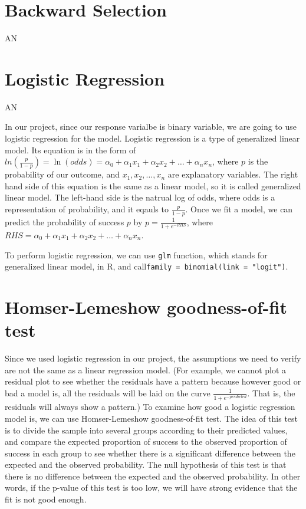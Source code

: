 \documentclass[12pt, oneside]{book}
\theoremstyle{definition}
\theoremstyle{definition}
\theoremstyle{definition}
\theoremstyle{remark}
\begin{document}
\hypertarget{backward-selection}{%
\section{Backward Selection}\label{backward-selection}}

AN

\hypertarget{logistic-regression}{%
\section{Logistic Regression}\label{logistic-regression}}

AN

In our project, since our response varialbe is binary variable, we are
going to use logistic regression for the model. Logistic regression is a
type of generalized linear model. Its equation is in the form of
\(ln(\frac{p}{1-p})=\ln(odds)=\alpha_0+\alpha_1x_1+\alpha_2x_2+\dots +\alpha_nx_n\),
where \(p\) is the probability of our outcome, and
\(x_1, x_2, \dots, x_n\) are explanatory variables. The right hand side
of this equation is the same as a linear model, so it is called
generalized linear model. The left-hand side is the natrual log of odds,
where odds is a representation of probability, and it eqauls to
\(\frac{p}{1-p}\). Once we fit a model, we can predict the probability
of success \(p\) by \(p = \frac{1}{1+e^{-RHS}}\), where
\(RHS=\alpha_0+\alpha_1x_1+\alpha_2x_2+\dots +\alpha_nx_n\).

To perform logistic regression, we can use \texttt{glm} function, which
stands for generalized linear model, in R, and
call\texttt{family\ =\ binomial(link\ =\ "logit")}.

\hypertarget{homser-lemeshow-goodness-of-fit-test}{%
\section{Homser-Lemeshow goodness-of-fit
test}\label{homser-lemeshow-goodness-of-fit-test}}

Since we used logistic regression in our project, the assumptions we
need to verify are not the same as a linear regression model. (For
example, we cannot plot a residual plot to see whether the residuals
have a pattern because however good or bad a model is, all the residuals
will be laid on the curve \(\frac{1}{1+e^{-predicted}}\). That is, the
residuals will always show a pattern.) To examine how good a logistic
regression model is, we can use Homser-Lemeshow goodness-of-fit test.
The idea of this test is to divide the sample into several groups
according to their predicted values, and compare the expected proportion
of success to the observed proportion of success in each group to see
whether there is a significant difference between the expected and the
observed probability. The null hypothesis of this test is that there is
no difference between the expected and the observed probability. In
other words, if the p-value of this test is too low, we will have strong
evidence that the fit is not good enough.
\end{document}
